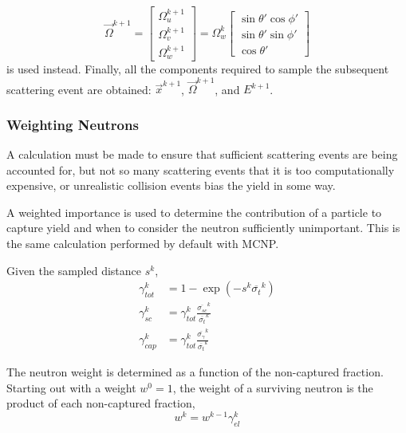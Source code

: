 \begin{equation}
        \overrightarrow{\Omega}^{k+1} = \begin{bmatrix}
        \Omega^{k+1}_u \\[8pt]
        \Omega^{k+1}_v \\[8pt]
        \Omega^{k+1}_w
    \end{bmatrix} = \Omega_w^k     \begin{bmatrix}
        \sin{\theta'}\cos{\phi'} \\[8pt]
        \sin{\theta'}\sin{\phi'} \\[8pt]
        \cos{\theta'}
    \end{bmatrix}
\end{equation}
is used instead. Finally, all the components required to sample the subsequent scattering event are obtained: $\overrightarrow{x}^{k+1}$, $\overrightarrow{\Omega}^{k+1}$, and $E^{k+1}$.

\subsubsection{Weighting Neutrons}
\label{sec:killing-neutrons-ms}
A calculation must be made to ensure that sufficient scattering events are being accounted for, but not so many scattering events that it is too computationally expensive, or unrealistic collision events bias the yield in some way.

A weighted importance is used to determine the contribution of a particle to capture yield and when to consider the neutron sufficiently unimportant. This is the same calculation performed by default with MCNP\cite{mcnp}. 

Given the sampled distance $s^{k}$,
\begin{align}
    \label{eq:tot-frac}
    \gamma_{tot}^{k} &=  1 - \exp{ \left(-s^{k} \overline{\sigma_{t}}^{k} \right)} \\
    \label{eq:el-frac}
    \gamma_{sc}^{k} &= \gamma_{tot}^{k} \frac{\overline{\sigma_{sc}}^{k}} {\overline{\sigma_{t}}^{k}} \\
    \label{eq:cap-frac}
    \gamma_{cap}^{k} &= \gamma_{tot}^{k} \frac{\overline{\sigma_{\gamma}}^{k}}{\overline{\sigma_{t}}^{k}}
\end{align}

The neutron weight is determined as a function of the non-captured fraction. Starting out with a weight $w^{0}=1$, the weight of a surviving neutron is the product of each non-captured fraction,
\begin{equation}
    \label{eq:neutron-weight}
    w^{k} = w^{k-1}\gamma_{el}^{k}
\end{equation}

